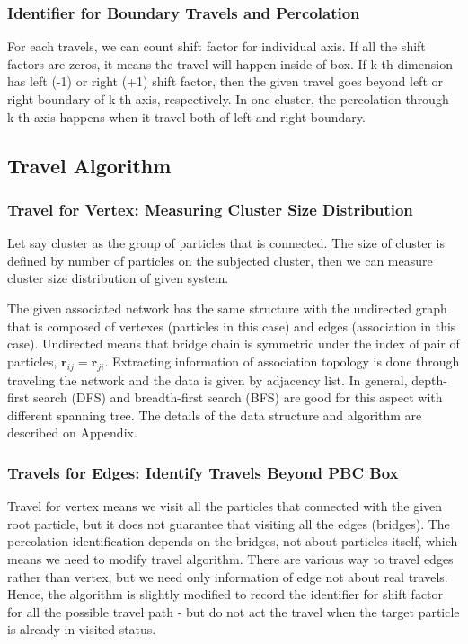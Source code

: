 \documentclass[10pt, a4paper]{article}
\begin{document}
\begin{appendices}
\subsubsection{Identifier for Boundary Travels and Percolation}
\label{sec:orgheadline5}
For each travels, we can count shift factor for individual axis. If all the shift factors are zeros, it means the travel will happen inside of box. If k-th dimension has left (-1) or right (+1) shift factor, then the given travel goes beyond left or right boundary of k-th axis, respectively. In one cluster, the percolation through k-th axis happens when it travel both of left and right boundary.

\subsection{Travel Algorithm}
\label{sec:orgheadline11}
\subsubsection{Travel for Vertex: Measuring Cluster Size Distribution}
\label{sec:orgheadline7}
Let say cluster as the group of particles that is connected. The size of cluster is defined by number of particles on the subjected cluster, then we can measure cluster size distribution of given system. 

The given associated network has the same structure with the undirected graph that is composed of vertexes (particles in this case) and edges (association in this case). Undirected means that bridge chain is symmetric under the index of pair of particles, \(\mathbf{r}_{ij} = \mathbf{r}_{ji}\). Extracting information of association topology is done through traveling the network and the data is given by adjacency list. In general, depth-first search (DFS) and breadth-first search (BFS) are good for this aspect with different spanning tree. The details of the data structure and algorithm are described on Appendix. 



\subsubsection{Travels for Edges: Identify Travels Beyond PBC Box}
\label{sec:orgheadline8}
Travel for vertex means we visit all the particles that connected with the given root particle, but it does not guarantee that visiting all the edges (bridges). The percolation identification depends on the bridges, not about particles itself, which means we need to modify travel algorithm. There are various way to travel edges rather than vertex, but we need only information of edge not about real travels. Hence, the algorithm is slightly modified to record the identifier for shift factor for all the possible travel path - but do not act the travel when the target particle is already in-visited status. 


\end{appendices}
\end{document}
